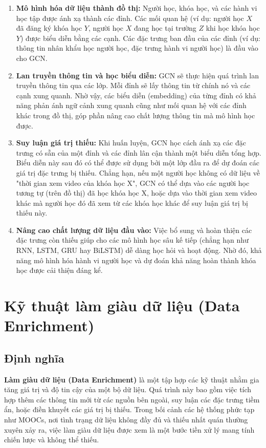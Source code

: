 \begin{enumerate}
    \item \textbf{Mô hình hóa dữ liệu thành đồ thị:} Người học, khóa học, và các hành vi học tập được ánh xạ thành các đỉnh. Các mối quan hệ (ví dụ: người học $X$ đã đăng ký khóa học $Y$, người học $X$ đang học tại trường $Z$ khi học khóa học $Y$) được biểu diễn bằng các cạnh. Các đặc trưng ban đầu của các đỉnh (ví dụ: thông tin nhân khẩu học người học, đặc trưng hành vi người học) là đầu vào cho GCN.
    \item \textbf{Lan truyền thông tin và học biểu diễn:} GCN sẽ thực hiện quá trình lan truyền thông tin qua các lớp. Mỗi đỉnh sẽ lấy thông tin từ chính nó và các cạnh xung quanh. Nhờ vậy, các biểu diễn (embedding) của từng đỉnh có khả năng phản ánh ngữ cảnh xung quanh cũng như mối quan hệ với các đỉnh khác trong đồ thị, góp phần nâng cao chất lượng thông tin mà mô hình học được.

    \item \textbf{Suy luận giá trị thiếu:} Khi huấn luyện, GCN học cách ánh xạ các đặc trưng có sẵn của một đỉnh và các đỉnh lân cận thành một biểu diễn tổng hợp. Biểu diễn này sau đó có thể được sử dụng bởi một lớp đầu ra để dự đoán các giá trị đặc trưng bị thiếu. Chẳng hạn, nếu một người học không có dữ liệu về "thời gian xem video của khóa học X", GCN có thể dựa vào các người học tương tự (trên đồ thị) đã học khóa học X, hoặc dựa vào thời gian xem video khác mà người học đó đã xem từ các khóa học khác để suy luận giá trị bị thiếu này.
    \item \textbf{Nâng cao chất lượng dữ liệu đầu vào:} Việc bổ sung và hoàn thiện các đặc trưng còn thiếu giúp cho các mô hình học sâu kế tiếp (chẳng hạn như RNN, LSTM, GRU hay BiLSTM) dễ dàng học hỏi và hoạt động. Nhờ đó, khả năng mô hình hóa hành vi người học và dự đoán khả năng hoàn thành khóa học được cải thiện đáng kể.

\end{enumerate}

\section{Kỹ thuật làm giàu dữ liệu (Data Enrichment)}

\subsection{Định nghĩa}
\textbf{Làm giàu dữ liệu (Data Enrichment)} là một tập hợp các kỹ thuật nhằm gia tăng giá trị và độ tin cậy của một bộ dữ liệu. Quá trình này bao gồm việc tích hợp thêm các thông tin mới từ các nguồn bên ngoài, suy luận các đặc trưng tiềm ẩn, hoặc điền khuyết các giá trị bị thiếu. Trong bối cảnh các hệ thống phức tạp như MOOCs, nơi tình trạng dữ liệu không đầy đủ và thiếu nhất quán thường xuyên xảy ra, việc làm giàu dữ liệu được xem là một bước tiền xử lý mang tính chiến lược và không thể thiếu.

